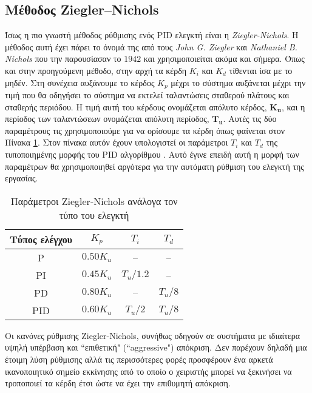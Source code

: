 \subsection{Μέθοδος Ziegler–Nichols} \label{subsec:Ziegle-Nichols Method}

Ίσως η πιο γνωστή μέθοδος ρύθμισης ενός PID ελεγκτή είναι η \emph{Ziegler-Nichols}. Η μέθοδος αυτή έχει πάρει το όνομά της από τους \emph{John G. Ziegler} και \emph{Nathaniel B. Nichols} που την παρουσίασαν το $1942$ και χρησιμοποιείται ακόμα και σήμερα. Όπως και στην προηγούμενη μέθοδο, στην αρχή τα κέρδη $K_i$ και $K_d$ τίθενται ίσα με το μηδέν. Στη συνέχεια αυξάνουμε το κέρδος $K_p$ μέχρι το σύστημα αυξάνεται μέχρι την τιμή που θα οδηγήσει το σύστημα να εκτελεί ταλαντώσεις σταθερού πλάτους και σταθερής περιόδου. Η τιμή αυτή του κέρδους ονομάζεται απόλυτο κέρδος, $\boldsymbol{K_u}$, και η περίοδος των ταλαντώσεων ονομάζεται απόλυτη περίοδος, $\boldsymbol{T_u}$. Αυτές τις δύο παραμέτρους τις χρησιμοποιούμε για να ορίσουμε τα κέρδη όπως φαίνεται στον Πίνακα \ref{table:zn_method}. Στον πίνακα αυτόν έχουν υπολογιστεί οι παράμετροι $T_i$ και $T_d$ της τυποποιημένης μορφής του PID αλγορίθμου \cite{ziegler-nichols}. Αυτό έγινε επειδή αυτή η μορφή των παραμέτρων θα χρησιμοποιηθεί αργότερα για την αυτόματη ρύθμιση του ελεγκτή της εργασίας.


\begin{table}[H]
 \begin{center}
 \begin{tabular}{|c|c|c|c|}
 \hline
 Τύπος ελέγχου & $K_p$ & $T_i$ & $T_d$ \\ \hline
 P & $0.50K_u$ & -- & -- \\ \hline
 PI & $0.45K_u$ & $T_u/1.2$ & -- \\ \hline
 PD & $0.80K_u$ & -- & $T_u/8$ \\ \hline
 PID & $0.60K_u$ & $T_u/2$ & $T_u/8$ \\ \hline
 \end{tabular}
 \caption{Παράμετροι Ziegler-Nichols ανάλογα τον τύπο του ελεγκτή}
 \label{table:zn_method}
 \end{center}
\end{table}

Οι κανόνες ρύθμισης Ziegler-Nichols, συνήθως οδηγούν σε συστήματα με ιδιαίτερα υψηλή υπέρβαση και ``επιθετική" (``aggressive") απόκριση. Δεν παρέχουν δηλαδή μια έτοιμη λύση ρύθμισης αλλά τις περισσότερες φορές προσφέρουν ένα αρκετά ικανοποιητικό σημείο εκκίνησης από το οποίο ο χειριστής μπορεί να ξεκινήσει να τροποποιεί τα κέρδη έτσι ώστε να έχει την επιθυμητή απόκριση.


